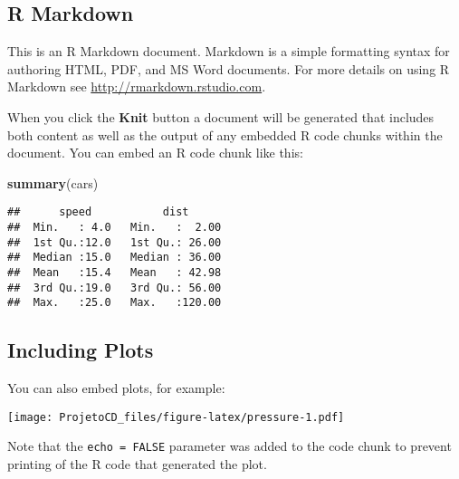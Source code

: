 \documentclass[]{article}
\newenvironment{Shaded}{\begin{snugshade}}{\end{snugshade}}
\newcommand{\KeywordTok}[1]{\textcolor[rgb]{0.13,0.29,0.53}{\textbf{#1}}}
\newcommand{\NormalTok}[1]{#1}
\begin{document}
\subsection{R Markdown}\label{r-markdown}

This is an R Markdown document. Markdown is a simple formatting syntax
for authoring HTML, PDF, and MS Word documents. For more details on
using R Markdown see \url{http://rmarkdown.rstudio.com}.

When you click the \textbf{Knit} button a document will be generated
that includes both content as well as the output of any embedded R code
chunks within the document. You can embed an R code chunk like this:

\begin{Shaded}
\begin{Highlighting}[]
\KeywordTok{summary}\NormalTok{(cars)}
\end{Highlighting}
\end{Shaded}

\begin{verbatim}
##      speed           dist       
##  Min.   : 4.0   Min.   :  2.00  
##  1st Qu.:12.0   1st Qu.: 26.00  
##  Median :15.0   Median : 36.00  
##  Mean   :15.4   Mean   : 42.98  
##  3rd Qu.:19.0   3rd Qu.: 56.00  
##  Max.   :25.0   Max.   :120.00
\end{verbatim}

\subsection{Including Plots}\label{including-plots}

You can also embed plots, for example:

\texttt{[image: ProjetoCD\_files/figure-latex/pressure-1.pdf]}

Note that the \texttt{echo\ =\ FALSE} parameter was added to the code
chunk to prevent printing of the R code that generated the plot.
\end{document}

